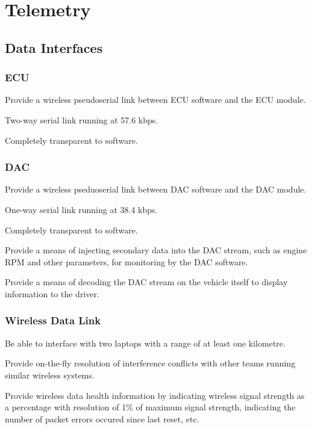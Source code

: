 \section{Telemetry}

\subsection{Data Interfaces}

\subsubsection{ECU}

Provide a wireless pseudoserial link between ECU software and the
ECU module.

Two-way serial link running at 57.6 kbps.

Completely transparent to software.


\subsubsection{DAC}

Provide a wireless pseduoserial link between DAC software and the
DAC module.

One-way serial link running at 38.4 kbps.

Completely transparent to software.

Provide a means of injecting secondary data into the DAC stream, such
as engine RPM and other parameters, for monitoring by the DAC software.

Provide a means of decoding the DAC stream on the vehicle itself to
display information to the driver.


\subsubsection{Wireless Data Link}

Be able to interface with two laptops with a range of at least one
kilometre.

Provide on-the-fly resolution of interference conflicts with other
teams running similar wireless systems.

Provide wireless data health information by indicating wireless signal
strength as a percentage with resolution of 1\% of maximum signal
strength, indicating the number of packet errors occured since last
reset, etc.